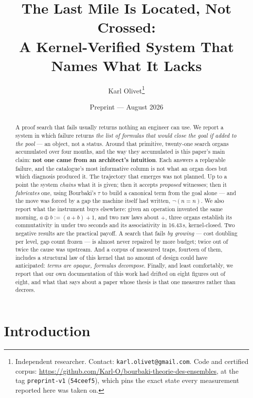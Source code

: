 \documentclass[11pt]{article}
\title{The Last Mile Is Located, Not Crossed:\\
A Kernel-Verified System That Names What It Lacks}
\author{Karl Olivet\thanks{Independent researcher. Contact:
\texttt{karl.olivet@gmail.com}. Code and certified corpus:
\url{https://github.com/Karl-O/bourbaki-theorie-des-ensembles}, at the tag
\texttt{preprint-v1} (\texttt{54ceef5}), which pins the exact state every measurement
reported here was taken on.}}
\date{Preprint --- August 2026}
\theoremstyle{remark}\newtheorem{remark}{Remark}
\begin{document}
\maketitle

\begin{abstract}
A proof search that fails usually returns nothing an engineer can use. We report a
system in which failure returns \emph{the list of formulas that would close the goal if
added to the pool} --- an object, not a status. Around that primitive, twenty-one search
organs accumulated over four months, and the way they accumulated is this paper's main
claim: \textbf{not one came from an architect's intuition}. Each answers a replayable
failure, and the catalogue's most informative column is not what an organ does but which
diagnosis produced it. The trajectory that emerges was not planned. Up to a point the
system \emph{chains} what it is given; then it accepts \emph{proposed} witnesses; then it
\emph{fabricates} one, using Bourbaki's $\tau$ to build a canonical term from the goal
alone --- and the move was forced by a gap the machine itself had written,
$\neg(n = n)$. We also report what the instrument buys elsewhere: given an operation
invented the same morning, $a \oplus b := (a+b)+1$, and two raw laws about $+$, three
organs establish its commutativity in under two seconds and its associativity in
16.43\,s, kernel-closed. Two negative results are the practical payoff. A search that
fails \emph{by growing} --- cost doubling per level, gap count frozen --- is almost never
repaired by more budget; twice out of twice the cause was upstream. And a corpus of
measured traps, fourteen of them, includes a structural law of this kernel that no
amount of design could have anticipated: \emph{terms are opaque, formulas decompose}.
Finally, and least comfortably, we report that our own documentation of this work had
drifted on eight figures out of eight, and what that says about a paper whose thesis is
that one measures rather than decrees.
\end{abstract}

\section{Introduction}
\label{sec:intro}
\end{document}
